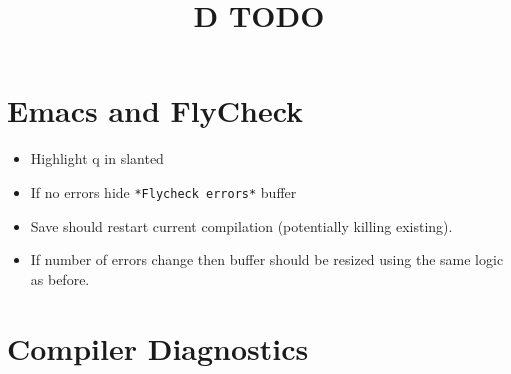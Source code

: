\documentclass[xcolor=dvipsnames, twocolumn]{article}
\title{D TODO}
\begin{document}
\section{Emacs and FlyCheck}

\begin{itemize}
\item Highlight q{} in slanted
\item If no errors hide \texttt{*Flycheck errors*} buffer
\item Save should restart current compilation (potentially killing existing).
\item If number of errors change then buffer should be resized using the same
  logic as before.
\end{itemize}

\section{Compiler Diagnostics}
\end{document}
